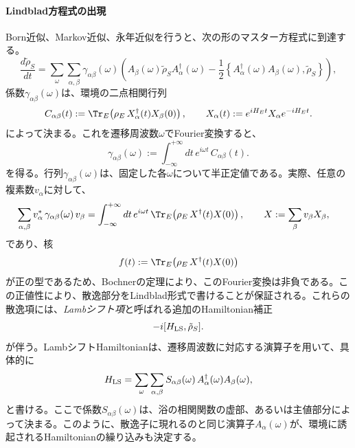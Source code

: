 \documentclass[a4paper,11pt,oneside]{article}
\theoremstyle{definition}
\numberwithin{equation}{section}
\begin{document}
\paragraph{Lindblad方程式の出現}



Born近似、Markov近似、永年近似を行うと、次の形のマスター方程式に到達する。
\begin{equation}\label{secular-gksl}
\frac{d\tilde \rho_S}{dt}
=
\sum_{\omega}\sum_{\alpha,\beta}
\gamma_{\alpha\beta}(\omega)
\left(
A_\beta(\omega)\tilde \rho_S A_\alpha^\dagger(\omega)
-\frac12
\left\{
A_\alpha^\dagger(\omega)A_\beta(\omega),\tilde \rho_S
\right\}
\right) ,
\end{equation}
係数$\gamma_{\alpha\beta}(\omega)$は、環境の二点相関行列
\begin{equation}
C_{\alpha\beta}(t)
:=
\Tr_E\!\left(\rho_E\,X_\alpha^\dagger(t) X_\beta(0)\right),
\qquad
X_\alpha(t):=e^{iH_E t}X_\alpha e^{-iH_E t} .
\end{equation}
によって決まる。これを遷移周波数$\omega$でFourier変換すると、
\begin{equation}
\gamma_{\alpha\beta}(\omega)
:=
\int_{-\infty}^{+\infty} dt\,e^{i\omega t}\,C_{\alpha\beta}(t) .
\end{equation}
を得る。行列$\gamma_{\alpha\beta}(\omega)$は、固定した各$\omega$について半正定値である。実際、任意の複素数$v_\alpha$に対して、
\begin{align}
\sum_{\alpha,\beta} v_\alpha^*\,\gamma_{\alpha\beta}(\omega)\,v_\beta
&=
\int_{-\infty}^{+\infty} dt\,e^{i\omega t}\,
\Tr_E\!\left(\rho_E\,X^\dagger(t)X(0)\right),
\qquad
X:=\sum_\beta v_\beta X_\beta ,
\end{align}
であり、核
\begin{equation}
f(t):=\Tr_E\!\left(\rho_E\,X^\dagger(t)X(0)\right)
\end{equation}
が正の型であるため、Bochnerの定理により、このFourier変換は非負である。この正値性により、散逸部分をLindblad形式で書けることが保証される。これらの散逸項には、\textit{Lambシフト項}と呼ばれる追加のHamiltonian補正
\begin{equation}
-i[H_{\rm LS},\tilde \rho_S] .
\end{equation}
が伴う。LambシフトHamiltonianは、遷移周波数に対応する演算子を用いて、具体的に
\begin{equation}
H_{\rm LS}
=
\sum_{\omega}\sum_{\alpha,\beta}
S_{\alpha\beta}(\omega)\,
A_\alpha^\dagger(\omega)A_\beta(\omega) ,
\end{equation}
と書ける。ここで係数$S_{\alpha\beta}(\omega)$は、浴の相関関数の虚部、あるいは主値部分によって決まる。このように、散逸子に現れるのと同じ演算子$A_\alpha(\omega)$が、環境に誘起されるHamiltonianの繰り込みも決定する。
\end{document}
